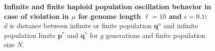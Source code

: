 \begin{figure}[H]
\begin{center}
\hspace{5pt}
\hspace{5pt}


\caption{\textbf{Infinite and finite haploid population oscillation behavior in case of violation in $\mu$ for genome length $\ell = 10$ and $\epsilon = 0.1$:} $d$ is
  distance between infinite or finite population ${\bm q}^n$ and infinite
  population limits ${{\bm p}^\ast}$ and ${{\bm q}^{\ast}}$ for $g$ generations and finite population size $N$.}
\label{oscillation_10h_vio_mu_0.1}
\end{center}
\end{figure}

